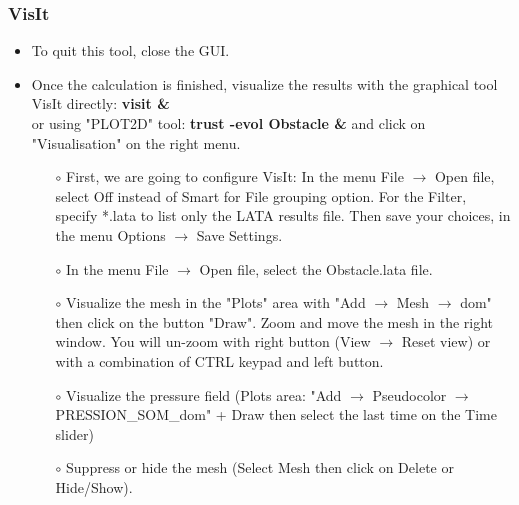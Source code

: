 \documentclass[10pt, hyperref={unicode=true,pdfusetitle, bookmarks=true,bookmarksnumbered=false,bookmarksopen=false, breaklinks=false,pdfborder={0 0 1},backref=true,colorlinks=true,linkcolor=darkblue,pageanchor}]{beamer}
\begin{document}
\begin{frame}
\frametitle{VisIt}
\begin{block}{}

\begin{itemize}
\item To quit this tool, close the GUI.

\item Once the calculation is finished, visualize the results with the graphical tool VisIt directly: \textbf{visit \&} \\
or using "PLOT2D" tool: \textbf{trust -evol Obstacle \&} and click on "Visualisation" on the right menu.

    \begin{itemize}
    \item [$\circ$] First, we are going to configure VisIt: {\footnotesize{In the menu File $\rightarrow$ Open file, select Off instead of Smart for File grouping option. For the Filter, specify *.lata to list only the LATA results file. Then save your choices, in the menu Options $\rightarrow$ Save Settings.}}

    \item [$\circ$] In the menu File $\rightarrow$ Open file, select the Obstacle.lata file.

    \item [$\circ$] Visualize the mesh in the "Plots" area with "Add $\rightarrow$ Mesh $\rightarrow$ dom" then click on the button "Draw". Zoom and move the mesh in the right window. You will un-zoom with right button (View $\rightarrow$ Reset view) or with a combination of CTRL keypad and left button.

    \item [$\circ$] Visualize the pressure field ({\footnotesize{Plots area: "Add $\rightarrow$ Pseudocolor $\rightarrow$ PRESSION\_SOM\_dom" + Draw then select the last time on the Time slider}})
    \item [$\circ$] Suppress or hide the mesh (Select Mesh then click on Delete or Hide/Show).
    \end{itemize}
\end{itemize}

\end{block}
\end{frame}
\end{document}
